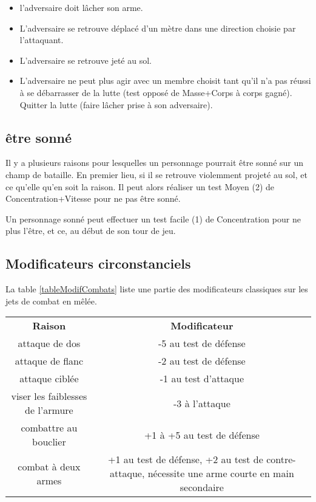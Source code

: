 \documentclass[10pt,a4paper,twocolumn]{book}
\begin{document}
\begin{itemize}
\item{}l’adversaire doit lâcher son arme.
\item{}L’adversaire se retrouve déplacé d’un mètre dans une direction choisie par l’attaquant.
\item{}L’adversaire se retrouve jeté au sol.
\item{}L’adversaire ne peut plus agir avec un membre choisit tant qu’il n’a pas réussi à se débarrasser de la lutte (test opposé de Masse+Corps à corps gagné).
Quitter la lutte (faire lâcher prise à son adversaire).
\end{itemize}

\subsection*{être sonné}
Il y a plusieurs raisons pour lesquelles un personnage pourrait être sonné sur un champ de bataille.
    En premier lieu, si il se retrouve violemment projeté au sol, et ce qu’elle qu’en soit la raison. Il peut alors réaliser un test Moyen (2) de Concentration+Vitesse pour ne pas être sonné.

Un personnage sonné peut effectuer un test facile (1) de Concentration pour ne plus l’être, et ce, au début de son tour de jeu.
\subsection*{Modificateurs circonstanciels}
La table \ref{tableModifCombats} liste une partie des modificateurs classiques sur les jets de combat en mêlée.
\begin{table*}
\caption{ Modificateurs courants en combat :}
\label{tableModifCombats}
\begin{center}
\begin{tabular}{cc}
\textbf{Raison} & \textbf{Modificateur} \\
   attaque de dos & -5 au test de défense  \\
   attaque de flanc & -2 au test de défense  \\
   attaque ciblée & -1 au test d'attaque\\
   viser les faiblesses de l'armure & -3 à l'attaque\\
   combattre au bouclier & +1 à +5 au test de défense \\
   combat à deux armes & +1 au test de défense, +2 au test de contre-attaque, nécessite une arme courte en main secondaire\\
\end{tabular}
\end{center}
\end{table*}
\end{document}
